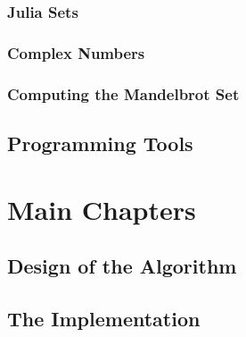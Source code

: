 \subsection{Julia Sets}
\subsection{Complex Numbers}
\subsection{Computing the Mandelbrot Set}


\section{Programming Tools}

\chapter{Main Chapters}
\section{Design of the Algorithm}

\section{The Implementation}

